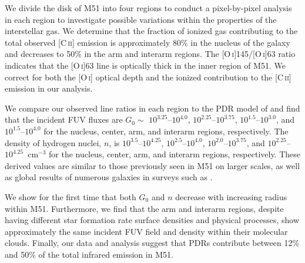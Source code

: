 We divide the disk of M51 into four regions to conduct a pixel-by-pixel analysis in each region to investigate possible variations within the properties of the interstellar gas.  We determine that the fraction of ionized gas contributing to the total observed [C\,\textsc{ii}] emission is approximately 80\% in the nucleus of the galaxy and decreases to 50\% in the arm and interarm regions.  The [O\,\textsc{i}]145/[O\,\textsc{i}]63 ratio indicates that the [O\,\textsc{i}]63 line is optically thick in the inner region of M51.  We correct for both the [O\,\textsc{i}] optical depth and the ionized contribution to the [C\,\textsc{ii}] emission in our analysis.

We compare our observed line ratios in each region to the PDR model of \citet{1999ApJ...527..795K} and find that the incident FUV fluxes are $G_{0}\sim$ $10^{3.25}$--$10^{4.0}$, $10^{2.25}$--$10^{3.75}$, $10^{1.5}$--$10^{3.0}$, and $10^{1.5}$--$10^{4.0}$ for the nucleus, center, arm, and interarm regions, respectively.  The density of hydrogen nuclei, $n$, is $10^{3.5}$--$10^{4.25}$, $10^{2.5}$--$10^{4.0}$, $10^{2.0}$--$10^{3.75}$, and $10^{2.25}$--$10^{4.25}$~cm$^{-3}$ for the nucleus, center, arm, and interarm regions, respectively.  These derived values are similar to those previously seen in M51 on larger scales, as well as global results of numerous galaxies in surveys such as \citet{2001ApJ...561..766M}.

We show for the first time that both $G_{0}$ and $n$ decrease with increasing radius within M51.  Furthermore, we find that the arm and interarm regions, despite having different star formation rate surface densities and physical processes, show approximately the same incident FUV field and density within their molecular clouds.  Finally, our data and analysis suggest that PDRs contribute between 12\% and 50\% of the total infrared emission in M51.


